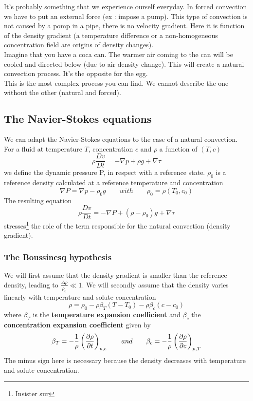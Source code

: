 		It's probably something that we experience ourself everyday. In forced convection we have to put an external force (ex : impose a pump). This type of convection is not caused by a pomp in a pipe, there is no velocity gradient. Here it is function of the density gradient (a temperature difference or a non-homogeneous concentration field are origins of density changes).\\ 
Imagine that you have a coca can. The warmer air coming to the can will be cooled and directed below (due to air density change). This will create a natural convection process. It's the opposite for the egg. \\
This is the most complex process you can find. We cannot describe the one without the other (natural and forced).\\

	\subsection{The Navier-Stokes equations}
		We can adapt the Navier-Stokes equations to the case of a natural convection. For a fluid at temperature $T$, concentration $c$ and $\rho$ a function of $(T,c)$
		\begin{equation}
			\rho \frac{D v}{D t} = -\nabla p + \rho g + \nabla \tau
		\end{equation}
		we define the dynamic pressure P, in respect with a reference state. $\rho _0$ is a reference density calculated at a reference temperature and concentration
		\begin{equation}
			\nabla P = \nabla p - \rho _0 g \qquad with \qquad \rho _ 0 = \rho (T_0,c_0)
		\end{equation}
		The resulting equation
		\begin{equation}
			\rho \frac{D v}{D t} = -\nabla P + (\rho - \rho _0) g + \nabla \tau
		\end{equation}		 
		stresses\footnote{Insister sur} the role of the term responsible for the natural convection (density gradient). 

		\subsubsection{The Boussinesq hypothesis}
			We will first assume that the density gradient is smaller than the reference density, leading to $\frac{\Delta \rho }{\rho _0} \ll 1$. 
			We will secondly assume that the density varies linearly with temperature and solute concentration 
			\begin{equation}
				\rho = \rho _0 - \rho \beta _T (T-T_0) - \rho \beta _c (c-c_0)
			\end{equation}
			where $\beta _T$ is the \textbf{temperature expansion coefficient} and $\beta _c$ the \textbf{concentration expansion coefficient} given by 
			\begin{equation}
				\beta _T = - \frac{1}{\rho} \left( \frac{\D \rho}{\D t} \right) _{p,c} \qquad and \qquad \beta _c = - \frac{1}{\rho} \left( \frac{\D \rho}{\D c} \right) _{p,T}
			\end{equation}
			The minus sign here is necessary because the density decreases with temperature and solute concentration. 
			
